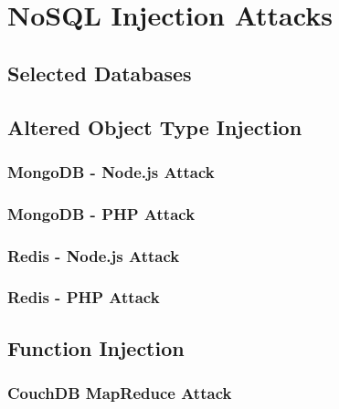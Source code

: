 \chapter{NoSQL Injection Attacks}

\section{Selected Databases}

\section{Altered Object Type Injection}
\subsection{MongoDB - Node.js Attack}
\subsection{MongoDB - PHP Attack}
\subsection{Redis - Node.js Attack}
\subsection{Redis - PHP Attack}

\section{Function Injection}
\subsection{CouchDB MapReduce Attack}